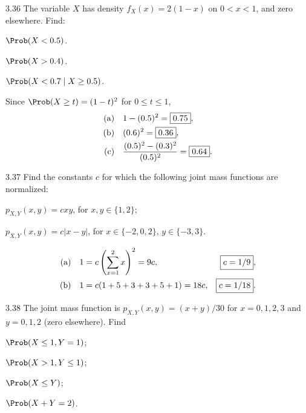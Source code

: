 \documentclass[11pt,oneside]{article}
\begin{document}
\begin{exercise}{3.36}
The variable $X$ has density $f_X(x)=2(1-x)$ on $0<x<1$, and zero elsewhere. Find:
\begin{exercisesubparts}
\item $\Prob(X<0.5)$.
\item $\Prob(X>0.4)$.
\item $\Prob(X<0.7\mid X\ge0.5)$.
\end{exercisesubparts}
\end{exercise}

\begin{solution}
Since $\Prob(X\ge t)=(1-t)^2$ for $0\le t\le1$,
\begin{align*}
\textup{(a)}\quad&1-(0.5)^2=\boxed{0.75},\\
\textup{(b)}\quad&(0.6)^2=\boxed{0.36},\\
\textup{(c)}\quad&\frac{(0.5)^2-(0.3)^2}{(0.5)^2}=\boxed{0.64}.
\end{align*}
\end{solution}

\begin{exercise}{3.37}
Find the constants $c$ for which the following joint mass functions are normalized:
\par
\begin{exercisesubparts}
\item $p_{X,Y}(x,y)=cxy$, for $x,y\in\{1,2\}$;
\item $p_{X,Y}(x,y)=c|x-y|$, for $x\in\{-2,0,2\}$, $y\in\{-3,3\}$. 
\end{exercisesubparts}
\end{exercise}

\begin{solution}
\begin{align*}
\textup{(a)}\quad&1=c\left(\sum_{x=1}^2x\right)^2=9c,
&\boxed{c=1/9},\\
\textup{(b)}\quad&1=c(1+5+3+3+5+1)=18c,
&\boxed{c=1/18}.
\end{align*}
\end{solution}

\begin{exercise}{3.38}
The joint mass function is $p_{X,Y}(x,y)=(x+y)/30$ for $x=0,1,2,3$ and $y=0,1,2$ (zero elsewhere). Find
\par
\begin{exercisesubparts}
\item $\Prob(X\le1,Y=1)$;
\item $\Prob(X>1,Y\le1)$;
\item $\Prob(X\le Y)$;
\item $\Prob(X+Y=2)$.
\end{exercisesubparts}
\end{exercise}
\end{document}

